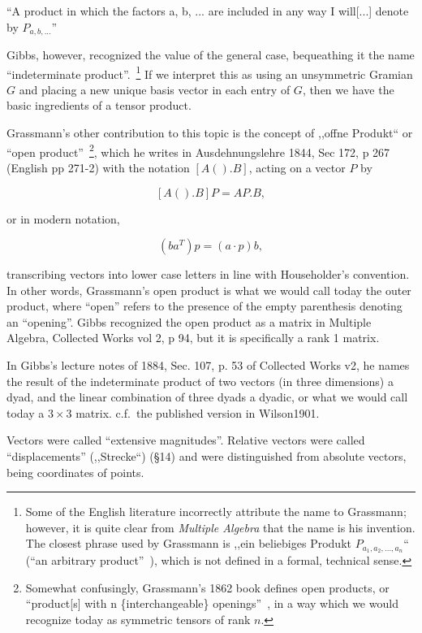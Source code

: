 ``A product in which the factors a, b, ... are included in any way I will[...] denote by $P_{a,b,...}$''~\cite[p. 22, \S 43]{Grassmann2000}

Gibbs, however, recognized the value of the general case, bequeathing it the name ``indeterminate product''.~\footnote{Some of the English literature incorrectly attribute the name to Grassmann; however, it is quite clear from \textit{Multiple Algebra} that the name is his invention. The closest phrase used by Grassmann is ,,ein beliebiges Produkt $P_{a_1, a_2, ..., a_n}$`` (``an arbitrary product''~\cite[p. 196, \S 353]{Grassmann2000}), which is not defined in a formal, technical sense.} If we interpret this as using an unsymmetric Gramian $G$ and placing a new unique basis vector in each entry of $G$, then we have the basic ingredients of a tensor product.

Grassmann's other contribution to this topic is the concept of ,,offne Produkt`` or ``open product''~\footnote{Somewhat confusingly, Grassmann's 1862 book defines open products, or ``product[s] with n \{interchangeable\} openings''~\cite[\S\S 353, p. 196]{Grassmann2000}, in a way which we would recognize today as symmetric tensors of rank $n$.}, which he writes in Ausdehnungslehre 1844, Sec 172, p 267 (English pp 271-2) with the notation $[A() . B]$, acting on a vector $P$ by

\[
[A() . B] P = AP . B,
\]

or in modern notation,

\[
(b a^T) p = (a\cdot p) b,
\]

transcribing vectors into lower case letters in line with Householder's
convention. In other words, Grassmann's open product is what we would call
today the outer product, where ``open'' refers to the presence of the empty
parenthesis denoting an ``opening''. Gibbs recognized the open product as a
matrix in Multiple Algebra, Collected Works vol 2, p 94, but it is specifically
a rank 1 matrix. 

In Gibbs's lecture notes of 1884, Sec. 107, p. 53 of Collected Works v2, he
names the result of the indeterminate product of two vectors (in three
dimensions) a dyad, and the linear combination of three dyads a dyadic, or what
we would call today a $3\times3$ matrix. c.f.\ the published version in
Wilson1901.

Vectors were called ``extensive magnitudes''. Relative vectors were called
``displacements'' (,,Strecke``) (\S 14) and were distinguished from absolute
vectors, being coordinates of points.

